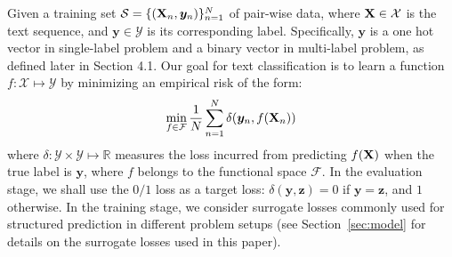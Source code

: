 \documentclass[11pt,a4paper]{article}
\newcommand{\beq}{\vspace{0mm}\begin{equation}}
\newcommand{\eeq}{\vspace{0mm}\end{equation}}
\newcommand{\Xmat}[0]{{{\bf X}}}
\newcommand{\yv}{\boldsymbol{y}}
\newcommand{\zv}{\boldsymbol{z}}
\newcommand{\R}{\mathbb{R}}
\newcommand{\Xcal}{\mathcal{X}}
\newcommand{\Ycal}{\mathcal{Y}}
\newcommand{\Scal}{\mathcal{S}}
\newcommand{\Fcal}{\mathcal{F}}
\begin{document}
Given a training set $\Scal  = \{ (\Xmat_n, \yv_n) \}_{n=1}^N$ of pair-wise data,
where $\Xmat \in \Xcal$  is the text sequence, and $\yv \in \Ycal$ is its corresponding label. Specifically, $\yv$ is a one hot vector in single-label problem and a binary vector in multi-label problem, as defined later in Section 4.1.
Our goal for text classification is to learn a function $f: \Xcal  \mapsto \Ycal$ by minimizing an empirical risk of the form:
	\vspace{-2mm}
\beq
\min_{f \in \Fcal} \frac{1}{N} \sum_{n=1}^{N} 
\delta (\yv_n, f(\Xmat_n) )
	\vspace{-2mm}
\label{eq:objective}
\eeq
where $\delta: \Ycal \times \Ycal \mapsto \R $  measures the loss incurred from
predicting $f(\Xmat)$ when the true label is $\yv$, where $f$ belongs to the functional space $\Fcal$. 
In the evaluation stage, we shall use the $0/1$ loss as a target loss: $\delta (\yv, \zv) = 0$ if $\yv = \zv$, and $1$ otherwise. 
In the training stage, we consider surrogate losses commonly used for structured prediction in different problem setups (see Section~\ref{sec:model} for details on the surrogate losses used
in this paper).
\end{document}
